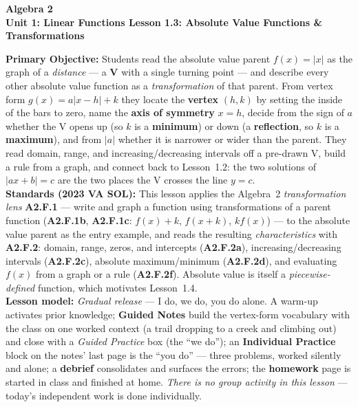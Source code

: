 \documentclass[10pt]{article}
\newcommand{\CourseName}{Algebra 2}
\newcommand{\UnitNumberName}{Unit 1: Linear Functions \quad}
\newcommand{\LessonNumberName}{Lesson 1.3: Absolute Value Functions \& Transformations}
\begin{document}
\begin{center}
    {\Large\bfseries \CourseName \\
    {\small\bfseries \UnitNumberName \LessonNumberName}}
\end{center}

\begin{tcolorbox}[colback=forestbg, colframe=forest, boxrule=0.9pt, arc=2mm,
    left=2mm, right=2mm, top=1.5mm, bottom=1.5mm]
    \textbf{Primary Objective:} Students read the absolute value parent $f(x)=|x|$ as the graph of
    a \emph{distance} --- a \textbf{V} with a single turning point --- and describe every other
    absolute value function as a \emph{transformation} of that parent. From vertex form
    $g(x)=a|x-h|+k$ they locate the \textbf{vertex} $(h,k)$ by setting the inside of the bars to
    zero, name the \textbf{axis of symmetry} $x=h$, decide from the sign of $a$ whether the V opens
    up (so $k$ is a \textbf{minimum}) or down (a \textbf{reflection}, so $k$ is a
    \textbf{maximum}), and from $|a|$ whether it is narrower or wider than the parent. They read
    domain, range, and increasing/decreasing intervals off a pre-drawn V, build a rule from a graph,
    and connect back to Lesson~1.2: the two solutions of $|ax+b|=c$ are the two places the V
    crosses the line $y=c$.
    \\[2pt]
    \textbf{Standards (2023 VA SOL):} This lesson applies the Algebra~2 \emph{transformation lens}
    \textbf{A2.F.1} --- write and graph a function using transformations of a parent function
    (\textbf{A2.F.1b}, \textbf{A2.F.1c}: $f(x)+k$, $f(x+k)$, $kf(x)$) --- to the absolute value
    parent as the entry example, and reads the resulting \emph{characteristics} with
    \textbf{A2.F.2}: domain, range, zeros, and intercepts (\textbf{A2.F.2a}), increasing/decreasing
    intervals (\textbf{A2.F.2c}), absolute maximum/minimum (\textbf{A2.F.2d}), and evaluating $f(x)$
    from a graph or a rule (\textbf{A2.F.2f}). Absolute value is itself a \emph{piecewise-defined}
    function, which motivates Lesson~1.4.
    \\[2pt]
    \textbf{Lesson model:} \emph{Gradual release} --- I do, we do, you do alone. A warm-up
    activates prior knowledge; \textbf{Guided Notes} build the vertex-form vocabulary with the
    class on one worked context (a trail dropping to a creek and climbing out) and close with a
    \emph{Guided Practice} box (the ``we do''); an \textbf{Individual Practice} block on the notes'
    last page is the ``you do'' --- three problems, worked silently and alone; a \textbf{debrief}
    consolidates and surfaces the errors; the \textbf{homework} page is started in class and
    finished at home. \emph{There is no group activity in this lesson} --- today's independent work
    is done individually.
\end{tcolorbox}
\end{document}
